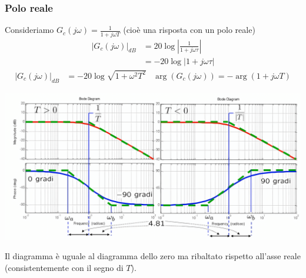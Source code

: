 \documentclass{article}
\numberwithin{equation}{subsection}
\begin{document}
\subsubsection{Polo reale}
Consideriamo $G_c(j\omega) = \frac{1}{1+j\omega T}$ (cioè una risposta con un polo reale)
\begin{align*}
    |G_c(j\omega)|_{dB} &= 20 \log \left|\frac{1}{1+j\omega \tau}\right|\\
    &= -20 \log |1+j\omega\tau|
\end{align*}
\begin{align*}
    |G_c(j\omega)|_{dB} &= -20 \log \sqrt{1+\omega^2T^2} & \arg(G_c(j\omega)) = -\arg(1+j\omega T)
\end{align*}
\begin{center}
    \includegraphics[scale=0.125]{Images/Diagramma_polo_reale.png}
\end{center}
Il diagramma è uguale al diagramma dello zero ma ribaltato rispetto all'asse reale (consistentemente con il segno di $T$).
\end{document}
